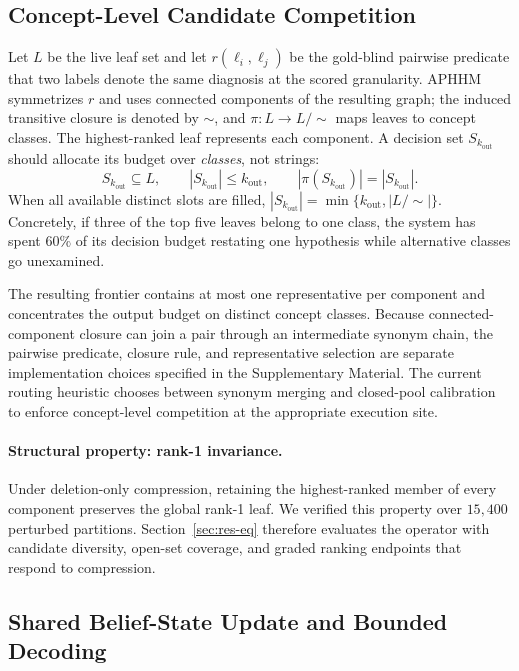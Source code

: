 \documentclass[letterpaper]{article} %
\begin{document}
\subsection{Concept-Level Candidate Competition}
\label{sec:m3}

Let $L$ be the live leaf set and let $r(\ell_i,\ell_j)$ be the gold-blind pairwise predicate that two labels denote the same diagnosis at the scored granularity.
APHHM symmetrizes $r$ and uses connected components of the resulting graph; the induced transitive closure is denoted by $\sim$, and $\pi:L\rightarrow L/\!\sim$ maps leaves to concept classes.
The highest-ranked leaf represents each component.
A decision set $S_{k_{\mathrm{out}}}$ should allocate its budget over \emph{classes}, not strings:
\[
S_{k_{\mathrm{out}}}\subseteq L,\qquad
|S_{k_{\mathrm{out}}}|\leq k_{\mathrm{out}},\qquad
|\pi(S_{k_{\mathrm{out}}})|=|S_{k_{\mathrm{out}}}|.
\]
When all available distinct slots are filled,
$|S_{k_{\mathrm{out}}}|=\min\{k_{\mathrm{out}},|L/\!\sim|\}$.
Concretely, if three of the top five leaves belong to one class, the system has spent $60\%$ of its decision budget restating one hypothesis while alternative classes go unexamined.

The resulting frontier contains at most one representative per component and concentrates the output budget on distinct concept classes.
Because connected-component closure can join a pair through an intermediate synonym chain, the pairwise predicate, closure rule, and representative selection are separate implementation choices specified in the Supplementary Material.
The current routing heuristic chooses between synonym merging and closed-pool calibration to enforce concept-level competition at the appropriate execution site.

\paragraph{Structural property: rank-1 invariance.}
Under deletion-only compression, retaining the highest-ranked member of every component preserves the global rank-1 leaf.
We verified this property over $15{,}400$ perturbed partitions.
Section~\ref{sec:res-eq} therefore evaluates the operator with candidate diversity, open-set coverage, and graded ranking endpoints that respond to compression.

\subsection{Shared Belief-State Update and Bounded Decoding}
\label{sec:m4}
\label{sec:m5}
\end{document}

